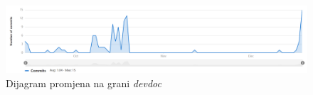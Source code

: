 		\bigskip
	
	\begin{figure}[h]
		\centering
		\includegraphics[width=\linewidth]{slike/devdoc.PNG}
		\caption{Dijagram promjena na grani \textit{devdoc}}
		\label{fig:devdoc}
	\end{figure}
	